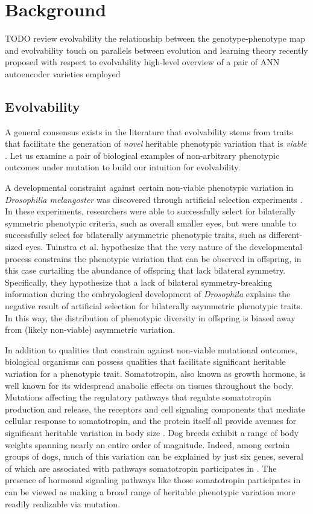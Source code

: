 \section{Background} \label{sec:background}

TODO
review evolvability
the relationship between the genotype-phenotype map and evolvability
touch on parallels between evolution and learning theory recently proposed with respect to evolvability
high-level overview of a pair of ANN autoencoder varieties employed

\subsection{Evolvability}
A general consensus exists in the literature that evolvability stems from traits that facilitate the generation of \textit{novel} heritable phenotypic variation that is \textit{viable} \cite{tarapore2015evolvability}.
Let us examine a pair of biological examples of non-arbitrary phenotypic outcomes under mutation to build our intuition for evolvability.

A developmental constraint against certain non-viable phenotypic variation in  \textit{Drosophilia melangoster} was discovered through artificial selection experiments \cite{coyne1987lack, tuinstra1990lack}.
In these experiments,  researchers were able to successfully select for bilaterally symmetric phenotypic criteria, such as overall smaller eyes, but were unable to successfully select for bilaterally asymmetric phenotypic traits, such as different-sized eyes.
Tuinstra et al. hypothesize that the very nature of the developmental process constrains the phenotypic variation that can be observed in offspring, in this case curtailing the abundance of offspring that lack bilateral symmetry.
Specifically, they hypothesize that a lack of bilateral symmetry-breaking information during the embryological development of \textit{Drosophila} explains the negative result of artificial selection for bilaterally asymmetric phenotypic traits.
In this way, the distribution of phenotypic diversity in offspring is biased away from (likely non-viable) asymmetric variation.

In addition to qualities that constrain against non-viable mutational outcomes, biological organisms can possess qualities that facilitate significant heritable variation for a phenotypic trait.
Somatotropin, also known as growth hormone, is well known for its widespread anabolic effects on tissues throughout the body.
Mutations affecting the regulatory pathways that regulate somatotropin production and release, the receptors and cell signaling components that mediate cellular response to somatotropin, and the protein itself all provide avenues for significant heritable variation in body size \cite{devesa2016multiple}.
Dog breeds exhibit a range of body weights spanning nearly an entire order of magnitude.
Indeed, among certain groups of dogs, much of this variation can be explained by just six genes, several of which are associated with pathways somatotropin participates in \cite{rimbault2013derived}.
The presence of hormonal signaling pathways like those somatotropin participates in can be viewed as making a broad range of heritable phenotypic variation more readily realizable via mutation.

